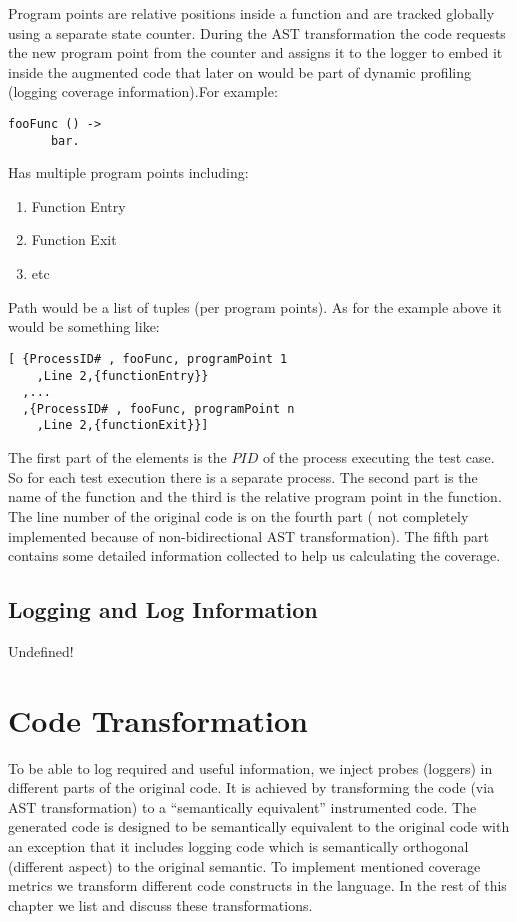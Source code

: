 \documentclass[12pt,a4paper]{report}
\begin{document}
Program points are relative positions inside a function and are tracked globally using a separate state counter. During the AST transformation the code requests the new
 program point from the counter and assigns it to the logger to embed it inside the augmented code that later on would be part of dynamic profiling (logging coverage
 information).For example:

\begin{lstlisting}
fooFunc () -> 
      bar.  
\end{lstlisting}

Has multiple program points including:

\begin{enumerate}
 \item Function Entry
 \item Function Exit
 \item etc
\end{enumerate}
 
Path would be a list of tuples (per program points). As for the example above it would be something like:

\begin{lstlisting}
[ {ProcessID# , fooFunc, programPoint 1
    ,Line 2,{functionEntry}}
  ,...
  ,{ProcessID# , fooFunc, programPoint n
    ,Line 2,{functionExit}}]
\end{lstlisting}

The first part of the elements is the $PID$ of the process executing the test case. So for each test execution there is a separate process. The second part is the name of the
 function and the third is the relative program point in the function. The line number of the original code is on the fourth part ( not completely implemented because of
 non-bidirectional AST transformation). The fifth part contains some detailed information collected to help us calculating the coverage.   

\subsection{Logging and Log Information}
Undefined!

\section{Code Transformation}
To be able to log required and useful information, we inject probes (loggers) in different parts of the original code. It is achieved by transforming the code (via AST
 transformation) to a “semantically equivalent” instrumented code. The generated code is designed to be semantically equivalent to the original code with an exception that it
 includes logging code which is semantically orthogonal (different aspect) to the original semantic. To implement mentioned coverage metrics we transform different code
 constructs in the language. In the rest of this chapter we list and discuss these transformations.
\end{document}
